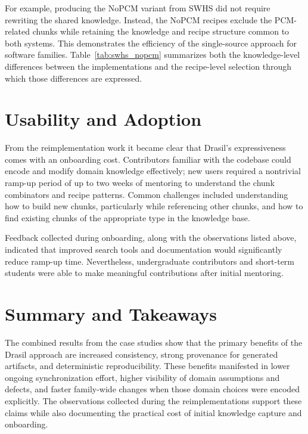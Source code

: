 For example, producing the NoPCM variant from SWHS did not require rewriting 
the shared knowledge. Instead, the NoPCM recipes exclude the PCM-related chunks 
while retaining the knowledge and recipe structure common to both systems. 
This demonstrates the efficiency of the single-source approach for software 
families. Table~\ref{tab:swhs_nopcm} summarizes both the knowledge-level 
differences between the implementations and the recipe-level selection through 
which those differences are expressed.

\section{Usability and Adoption}
From the reimplementation work it became clear that Drasil's expressiveness 
comes with an onboarding cost. Contributors familiar with the codebase could 
encode and modify domain knowledge effectively; new users required a nontrivial 
ramp-up period of up to two weeks of mentoring to understand the chunk 
combinators and recipe patterns. Common challenges included understanding how 
to build new chunks, particularly while referencing other chunks, and how to 
find existing chunks of the appropriate type in the knowledge base. 

Feedback collected during onboarding, along with the observations listed above, 
indicated that improved search tools and documentation would significantly 
reduce ramp-up time. Nevertheless, undergraduate contributors and short-term 
students were able to make meaningful contributions after initial mentoring.


\section{Summary and Takeaways}
The combined results from the case studies show that the primary benefits of
the Drasil approach are increased consistency, strong provenance for
generated artifacts, and deterministic reproducibility. These benefits
manifested in lower ongoing synchronization effort, higher visibility of
domain assumptions and defects, and faster family-wide changes when those
domain choices were encoded explicitly. The observations collected
during the reimplementations support these claims while also documenting the
practical cost of initial knowledge capture and onboarding.

